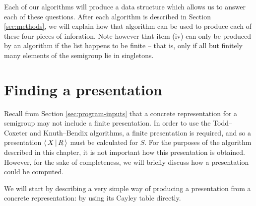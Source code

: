 Each of our algorithms will produce a data structure which allows us to answer
each of these questions.  After each algorithm is described in Section
\ref{sec:methods}, we will explain how that algorithm can be used to produce
each of these four pieces of inforation.  Note however that item (iv) can only
be produced by an algorithm if the list happens to be finite -- that is, only if
all but finitely many elements of the semigroup lie in singletons.

\section{Finding a presentation}
\label{sec:find-pres}

Recall from Section \ref{sec:program-inputs} that a concrete representation for
a semigroup may not include a finite presentation.  In order to use the Todd--Coxeter and
Knuth--Bendix algorithms, a finite presentation is required, and so a presentation
$\left\langle \, X \, \middle| \, R \, \right\rangle$ must be calculated for $S$.  For the purposes of the algorithm
described in this chapter, it is not important how this presentation is
obtained.  However, for the sake of completeness, we will briefly discuss how a
presentation could be computed.

We will start by describing a very simple way of producing a presentation from a
concrete representation: by using its Cayley table directly.

